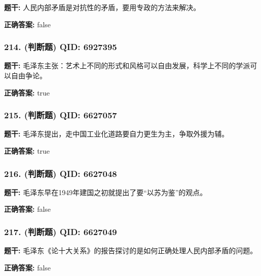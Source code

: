 \documentclass[12pt,UTF8]{ctexart}
\begin{document}
\textbf{题干:}
人民内部矛盾是对抗性的矛盾，要用专政的方法来解决。

\textbf{正确答案:}
false

\vspace{0.3em}\hrulefill\vspace{0.7em}

\subsubsection*{214. (判断题) \small QID: 6927395}

\textbf{题干:}
毛泽东主张：艺术上不同的形式和风格可以自由发展，科学上不同的学派可以自由争论。

\textbf{正确答案:}
true

\vspace{0.3em}\hrulefill\vspace{0.7em}

\subsubsection*{215. (判断题) \small QID: 6627057}

\textbf{题干:}
毛泽东提出，走中国工业化道路要自力更生为主，争取外援为辅。

\textbf{正确答案:}
true

\vspace{0.3em}\hrulefill\vspace{0.7em}

\subsubsection*{216. (判断题) \small QID: 6627048}

\textbf{题干:}
毛泽东早在1949年建国之初就提出了要“以苏为鉴”的观点。

\textbf{正确答案:}
false

\vspace{0.3em}\hrulefill\vspace{0.7em}

\subsubsection*{217. (判断题) \small QID: 6627049}

\textbf{题干:}
毛泽东《论十大关系》的报告探讨的是如何正确处理人民内部矛盾的问题。

\textbf{正确答案:}
false

\vspace{0.3em}\hrulefill\vspace{0.7em}
\end{document}
